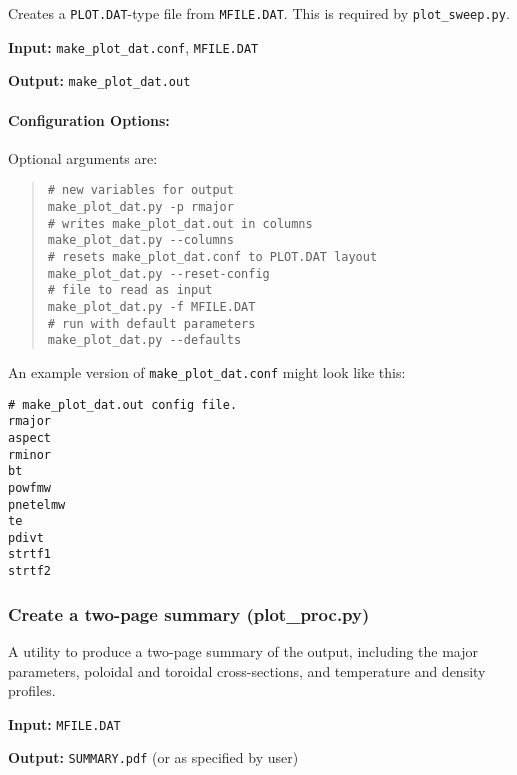 \documentclass[11pt,a4paper]{article}
\newcommand{\mfile}{\mbox{\texttt{MFILE.DAT}}}
\newcommand{\plotdat}{\mbox{\texttt{PLOT.DAT}}}
\begin{document}
Creates a \plotdat-type file from \mfile.  This is required by \texttt{plot\_sweep.py}.

\begin{description}
\item{\textbf{Input:}}
\verb|make_plot_dat.conf|, \mfile\

\item{\textbf{Output:}}
\verb|make_plot_dat.out|
\end{description}

\paragraph{Configuration Options:}

Optional arguments are:
\begin{quote}
\begin{verbatim}
# new variables for output
make_plot_dat.py -p rmajor
# writes make_plot_dat.out in columns
make_plot_dat.py --columns
# resets make_plot_dat.conf to PLOT.DAT layout
make_plot_dat.py --reset-config
# file to read as input
make_plot_dat.py -f MFILE.DAT
# run with default parameters
make_plot_dat.py --defaults
\end{verbatim}
\end{quote}

An example version of \texttt{make\_plot\_dat.conf} might look like this:
\begin{framed}
\begin{verbatim}
# make_plot_dat.out config file.
rmajor
aspect
rminor
bt
powfmw
pnetelmw
te
pdivt
strtf1
strtf2
\end{verbatim}
\end{framed}


\subsubsection{Create a two-page summary (plot\_proc.py)}

A utility to produce a two-page summary of the output, including the major
parameters, poloidal and toroidal cross-sections, and temperature and density profiles.

\begin{description}
\item{\textbf{Input:}}
 \mfile

\item{\textbf{Output:}}
\verb|SUMMARY.pdf| (or as specified by user)
\end{description}
\end{document}
